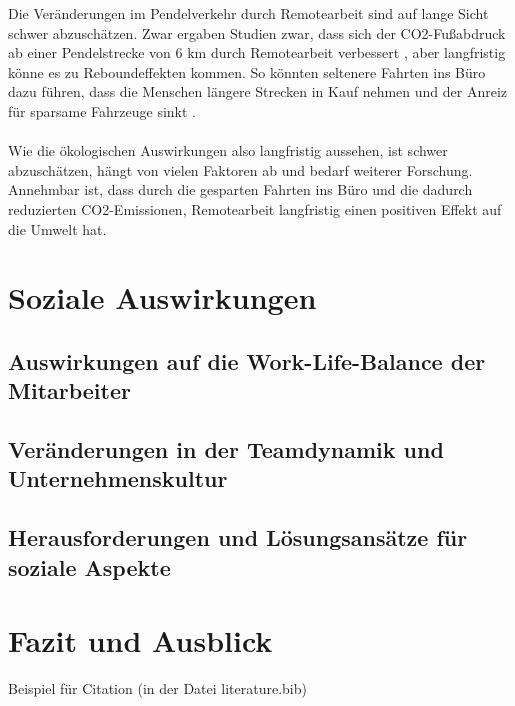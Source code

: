 \documentclass[runningheads]{llncs}
\begin{document}
Die Veränderungen im Pendelverkehr durch Remotearbeit sind auf lange Sicht schwer abzuschätzen.
Zwar ergaben Studien zwar, dass sich der CO2-Fußabdruck ab einer Pendelstrecke von 6 km durch Remotearbeit verbessert \cite{daniel_crow_working_2022}, aber langfristig könne es zu Reboundeffekten kommen.
So könnten seltenere Fahrten ins Büro dazu führen, dass die Menschen längere Strecken in Kauf nehmen und der Anreiz für sparsame Fahrzeuge sinkt \cite{waldemar_marz_reduziert_2022}.\\\\
Wie die ökologischen Auswirkungen also langfristig aussehen, ist schwer abzuschätzen, hängt von vielen Faktoren ab und bedarf weiterer Forschung.
Annehmbar ist, dass durch die gesparten Fahrten ins Büro und die dadurch reduzierten CO2-Emissionen, Remotearbeit langfristig einen positiven Effekt auf die Umwelt hat.

\section{Soziale Auswirkungen}

\subsection{Auswirkungen auf die Work-Life-Balance der Mitarbeiter}

\subsection{Veränderungen in der Teamdynamik und Unternehmenskultur}

\subsection{Herausforderungen und Lösungsansätze für soziale Aspekte}


\section{Fazit und Ausblick}

Beispiel für Citation\cite{noauthor_internet-konferenz_2021}
(in der Datei literature.bib)




\end{document}
